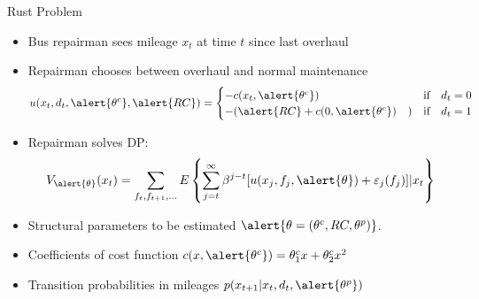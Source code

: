 \documentclass[xcolor=pdftex,dvipsnames,table,mathserif,aspectratio=169]{beamer}
\begin{document}
\begin{frame}{Rust Problem}
\footnotesize
\begin{itemize}
\item Bus repairman sees mileage $x_t$ at time $t$ since last overhaul
\item Repairman chooses between overhaul and normal maintenance
\begin{align*}
u(x_t, d_t, \alert{\theta^c}, \alert{RC}) =
\begin{cases} -c(x_t,\alert{\theta^c}) \quad &\mbox{if} \quad d_t=0\\
-(\alert{RC} + c(0,\alert{\theta^c}) \quad) &\mbox{if} \quad d_t =1\\
\end{cases}
\end{align*}
\item Repairman solves DP:
\begin{align*}
V_{\alert{\theta}} (x_t) = \sum_{f_t,f_{t+1},\ldots} E \left\{  \sum_{j=t}^{\infty} \beta^{j-t}   [u(x_j,f_j,\alert{\theta}) + \varepsilon_{j}(f_j)]| x_t \right\}
\end{align*}
\end{itemize}
\begin{itemize}
\item Structural parameters to be estimated $\alert{\theta = (\theta^c, RC, \theta^p)}$.
\item Coefficients of cost function $c(x,\alert{\theta^c}) = \theta^c_1 x + \theta^c_2 x^2$
\item Transition probabilities in mileages $p(x_{t+1} | x_t, d_t, \alert{\theta^p})$
\end{itemize}
\end{frame}
\end{document}
